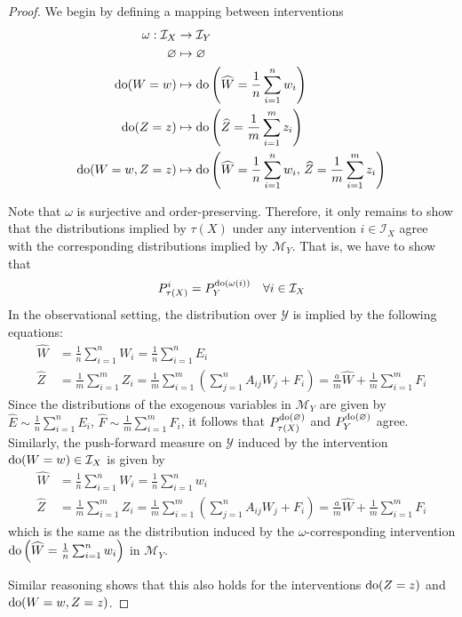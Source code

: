 \medskip

\begin{proof}
We begin by defining a mapping between interventions
\begin{align*}
\omega : \mathcal{I}_X &\rightarrow \mathcal{I}_Y \\
\varnothing &\mapsto \varnothing \\
\operatorname{do}(W= w)&\mapsto \operatorname{do}\left(\widehat{W} = \frac{1}{n}\sum_{i=1}^n w_i\right) \\
\operatorname{do}(Z= z)&\mapsto \operatorname{do}\left(\widehat{Z} = \frac{1}{m}\sum_{i=1}^m z_i\right) \\
\operatorname{do}(W=w, Z=z)&\mapsto \operatorname{do}\left(\widehat{W} = \frac{1}{n}\sum_{i=1}^n w_i,\, \widehat{Z} = \frac{1}{m}\sum_{i=1}^m z_i\right)
\end{align*}

Note that $\omega$ is surjective and order-preserving.
Therefore, it only remains to show that the distributions implied by $\tau(X)$ under any intervention $i\in\mathcal{I}_X$ agree with the corresponding distributions implied by $\mathcal{M}_Y$.
That is, we have to show that
\[ P_{\tau(X)}^{i} = P_{Y}^{\operatorname{do}(\omega(i))} \quad \forall i\in\mathcal{I}_X \]
%
In the observational setting, the distribution over $\mathcal{Y}$ is implied by the following equations:
%
\begin{align*}
\widehat{W} &= \frac{1}{n}\sum_{i=1}^n W_i = \frac{1}{n}\sum_{i=1}^n E_i \\
\widehat{Z} &= \frac{1}{m}\sum_{i=1}^m Z_i =  \frac{1}{m}\sum_{i=1}^m \left( \sum_{j=1}^n A_{ij}W_j  + F_i\right) = \frac{a}{m}\widehat{W} +  \frac{1}{m}\sum_{i=1}^m F_i
\end{align*}
%
Since the distributions of the exogenous variables in $\mathcal{M}_Y$ are given by $\widehat{E} \sim \frac{1}{n}\sum_{i=1}^n E_i$, $\widehat{F} \sim \frac{1}{m}\sum_{i=1}^m F_i$, it follows that $P_{\tau(X)}^{\operatorname{do}(\varnothing)}$  and $P_{Y}^{\operatorname{do}(\varnothing)}$ agree. Similarly, the push-forward measure on $\mathcal{Y}$ induced by the intervention $\operatorname{do}(W=w)\in\mathcal{I}_X$ is given by
%
\begin{align*}
\widehat{W} &= \frac{1}{n}\sum_{i=1}^n W_i = \frac{1}{n}\sum_{i=1}^n w_i \\
\widehat{Z} &= \frac{1}{m}\sum_{i=1}^m Z_i =  \frac{1}{m}\sum_{i=1}^m \left( \sum_{j=1}^n A_{ij}W_j  + F_i\right) = \frac{a}{m}\widehat{W} +  \frac{1}{m}\sum_{i=1}^m F_i
\end{align*}
which is the same as the distribution induced by the $\omega$-corresponding intervention $\operatorname{do}\left(\widehat{W} = \frac{1}{n}\sum_{i=1}^n w_i\right)$ in $\mathcal{M}_Y$.

Similar reasoning shows that this also holds for the interventions $\operatorname{do}(Z=z)$ and $\operatorname{do}(W=w, Z=z)$.

\end{proof}



